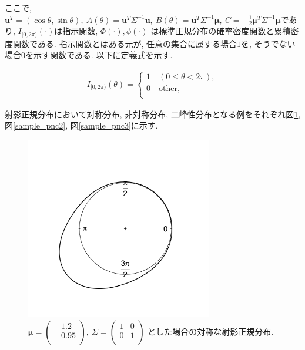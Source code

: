 \documentclass[a4j,12pt]{jarticle}
\begin{document}
\noindent
ここで, $\bm u^T = (\cos\theta,\sin\theta), \ A(\theta) = \bm u^T\Sigma^{-1}\bm u, \ B(\theta) = \bm u^T \Sigma^{-1} \bm \mu, \ C = -\frac{1}{2} \bm \mu^T \Sigma^{-1} \bm \mu$であり, $I_{[0,2\pi)} (\cdot)$は指示関数, $\Phi(\cdot), \phi(\cdot)$ は標準正規分布の確率密度関数と累積密度関数である. 指示関数とはある元が, 任意の集合に属する場合$1$を, そうでない場合$0$を示す関数である. 以下に定義式を示す.

\begin{eqnarray*}
I_{[0,2\pi)}(\theta) = \left\{
    \begin{array}{ll}
      1 \quad (0 \leq \theta < 2\pi), \\
      0 \quad \mbox{other}, \\
\end{array}
\right.
\end{eqnarray*}

射影正規分布において対称分布, 非対称分布, 二峰性分布となる例をそれぞれ図\ref{sample_pnc1}, 図\ref{sample_pnc2}, 図\ref{sample_pnc3}に示す. 

\begin{figure}[bp]
\begin{center}
\includegraphics[clip,height= 80mm]{data/sample_symmetry.png}
\caption[対称な射影正規分布]{
$\bm \mu = \begin{pmatrix} -1.2 \\ -0.95 \\ \end{pmatrix}, \ \Sigma = \begin{pmatrix}  1 & 0 \\ 0 & 1 \\ \end{pmatrix}$
とした場合の対称な射影正規分布.}
\label{sample_pnc1}
\end{center}
\end{figure}
\end{document}
